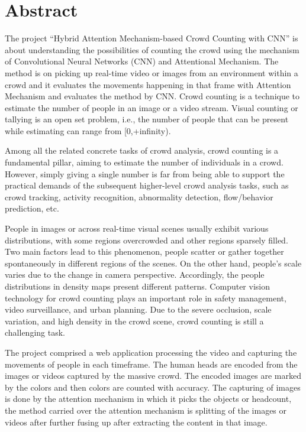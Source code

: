 \documentclass[12pt]{report}
\begin{document}
\chapter*{Abstract}
\thispagestyle{empty}
The project “Hybrid Attention Mechanism-based Crowd Counting with CNN” is about understanding the possibilities of counting the crowd using the mechanism of Convolutional Neural Networks (CNN) and Attentional Mechanism. The method is on picking up real-time video or images from an environment within a crowd and it evaluates the movements happening in that frame with Attention Mechanism and evaluates the method by CNN. Crowd counting is a technique to estimate the number of people in an image or a video stream. Visual counting or tallying is an open set problem, i.e., the number of people that can be present while estimating can range from [0,+infinity).
\newline

Among all the related concrete tasks of crowd analysis, crowd counting is a fundamental pillar, aiming to estimate the number of individuals in a crowd. However, simply giving a single number is far from being able to support the practical demands of the subsequent higher-level crowd analysis tasks, such as crowd tracking, activity recognition, abnormality detection, flow/behavior prediction, etc.
\newline

People in images or across real-time visual scenes usually exhibit various distributions, with some regions overcrowded and other regions sparsely filled. Two main factors lead to this phenomenon, people scatter or gather together spontaneously in different regions of the scenes. On the other hand, people’s scale varies due to the change in camera perspective. Accordingly, the people distributions in density maps present different patterns. Computer vision technology for crowd counting plays an important role in safety management, video surveillance, and urban planning. Due to the severe occlusion, scale variation, and high density in the crowd scene, crowd counting is still a challenging task.
\newline

The project comprised a web application processing the video and capturing the movements of people in each timeframe. The human heads are encoded from the images or videos captured by the massive crowd. The encoded images are marked by the colors and then colors are counted with accuracy. The capturing of images is done by the attention mechanism in which it picks the objects or headcount, the method carried over the attention mechanism is splitting of the images or videos after further fusing up after extracting the content in that image.
\newline
\end{document}
